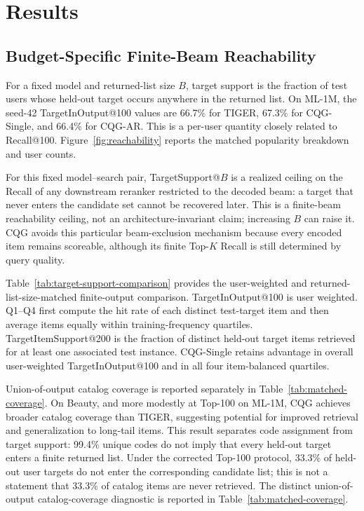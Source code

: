 \documentclass[letterpaper]{article}
\begin{document}
\section{Results}

\subsection{Budget-Specific Finite-Beam Reachability}

For a fixed model and returned-list size $B$, target support is the fraction of test
users whose held-out target occurs anywhere in the returned list. On ML-1M,
the seed-42 TargetInOutput@100 values are 66.7\% for TIGER, 67.3\% for
CQG-Single, and 66.4\% for CQG-AR. This is a per-user quantity closely related
to Recall@100.
Figure~\ref{fig:reachability} reports the matched popularity breakdown and
user counts.

For this fixed model--search pair, TargetSupport@$B$ is a realized ceiling on
the Recall of any downstream reranker restricted to the decoded beam: a target
that never enters the candidate set cannot be recovered later. This is a
finite-beam reachability ceiling, not an architecture-invariant claim; increasing
$B$ can raise it. CQG avoids this particular beam-exclusion mechanism because
every encoded item remains scoreable, although its finite Top-$K$ Recall is
still determined by query quality.

Table~\ref{tab:target-support-comparison} provides the user-weighted and returned-list-size-matched finite-output comparison. TargetInOutput@100 is user weighted. Q1--Q4 first compute the hit rate of each distinct test-target item and then average items equally within training-frequency quartiles. TargetItemSupport@200 is the fraction of distinct held-out target items retrieved for at least one associated test instance. 
CQG-Single retains advantage in overall user-weighted TargetInOutput@100 and in all four item-balanced quartiles.

Union-of-output catalog coverage is reported separately in Table~\ref{tab:matched-coverage}. On Beauty, and more modestly at Top-100 on ML-1M, CQG achieves broader
catalog coverage than TIGER, suggesting potential for improved retrieval
and generalization to long-tail items.
This result separates code assignment from target support: 99.4\% unique codes do not imply that every held-out target enters a finite returned list. Under the corrected Top-100 protocol, 33.3\% of held-out user targets do not enter the corresponding candidate list; this is not a statement that 33.3\% of catalog items are never retrieved. The distinct union-of-output catalog-coverage diagnostic is reported in Table~\ref{tab:matched-coverage}.
\end{document}

